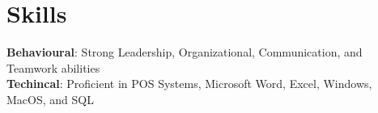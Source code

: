 \section{Skills}
 \begin{itemize}[leftmargin=0.15in, label={}]
    \small{\item{
      \textbf{Behavioural}{: Strong Leadership, Organizational, Communication, and Teamwork abilities} \\
     \textbf{Techincal}{: Proficient in POS Systems, Microsoft Word, Excel, Windows, MacOS, and SQL}\\
    }}
 \end{itemize}